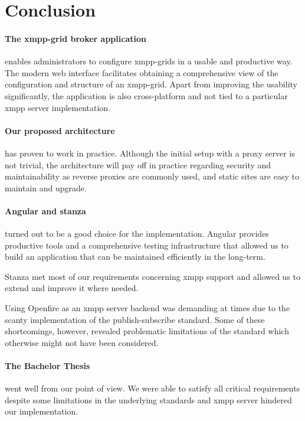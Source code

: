 \section{Conclusion}
\paragraph{The \gls{xmpp-grid} \gls{broker} application} enables administrators to configure \glspl{xmpp-grid} in a usable and productive way.
The modern web interface facilitates obtaining a comprehensive view of the configuration and structure of an \gls{xmpp-grid}.
Apart from improving the usability significantly, the application is also cross-platform and not tied to a particular \gls{xmpp} server implementation.

\paragraph{Our proposed architecture} has proven to work in practice.
Although the initial setup with a proxy server is not trivial, the architecture will pay off in practice regarding security and maintainability as reverse proxies are commonly used, and static sites are easy to maintain and upgrade.

\paragraph{Angular and stanza} turned out to be a good choice for the implementation.
Angular provides productive tools and a comprehensive testing infrastructure that allowed us to build an application that can be maintained efficiently in the long-term.

Stanza met most of our requirements concerning \gls{xmpp} support and allowed us to extend and improve it where needed.

Using Openfire as an \gls{xmpp} server backend was demanding at times due to the scanty implementation of the \gls{publish-subscribe} standard.
Some of these shortcomings, however, revealed problematic limitations of the standard which otherwise might not have been considered.

\paragraph{The Bachelor Thesis} went well from our point of view.
We were able to satisfy all critical requirements despite some limitations in the underlying standards and \gls{xmpp} server hindered our implementation.

